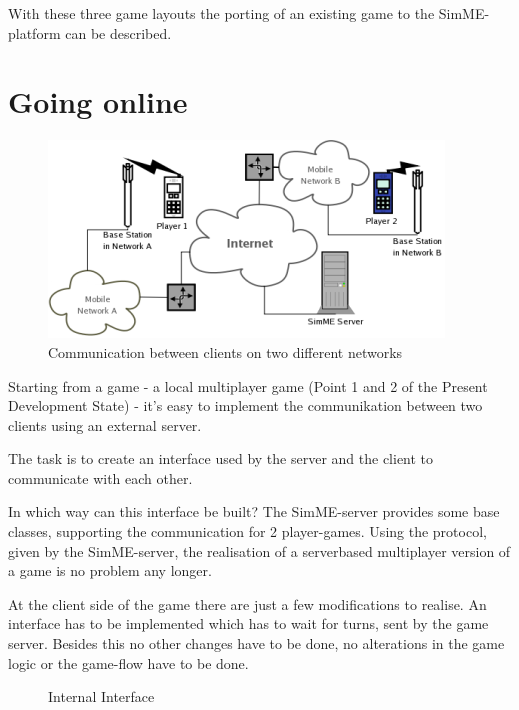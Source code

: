 	With these three game layouts the porting of an existing game to the
	SimME-platform can be described.


\section{Going online} \label{sec:going_online}

	\begin{figure}[htbp]
		\begin{center}
			\includegraphics{pics/communication-small.png}
			\caption{Communication between clients on two different networks}
			\label{fig:communication}
		\end{center}
	\end{figure}

	Starting from a game - a local multiplayer game (Point 1 and 2 of the Present
	Development State) - it's easy to implement the communikation between two
	clients using an external server.
	
	The task is to create an interface used by the server and the client to
	communicate with each other.
	
	In which way can this interface be built? The SimME-server provides some base
	classes, supporting the communication for 2 player-games. Using the protocol,
	given by the SimME-server, the realisation of a serverbased multiplayer version
	of a game is no problem any longer.
	
	At the client side of the game there are just a few modifications to realise.
	An interface has to be implemented which has to wait for turns, sent by the
	game server. Besides this no other changes have to be done, no alterations in
	the game logic or the game-flow have to be done.

	\begin{figure}[h]
	\begin{center}
	\caption{Internal Interface}
	\end{center}
	\end{figure}


